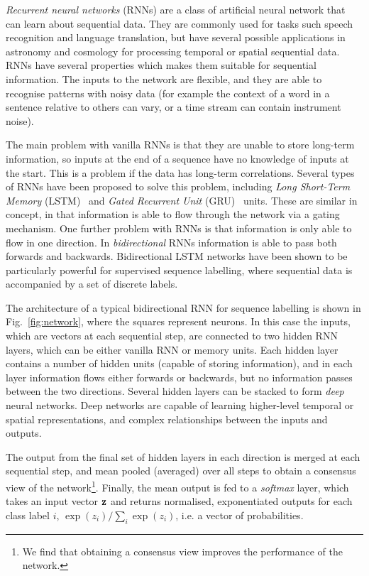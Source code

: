 \documentclass[nofootinbib,amsmath,amssymb,10pt,eqsecnum, twocolumn]{revtex4-1}
\begin{document}
{\em Recurrent neural networks} (RNNs) are a class of artificial neural network  that can learn about sequential data. They are commonly used for tasks such speech recognition and language translation, but have several possible applications in astronomy  and cosmology for processing temporal or spatial sequential data. RNNs have several properties which makes them suitable for sequential information. The inputs to the network are flexible, and they are able to recognise patterns with noisy data (for example the context of a word in a sentence relative to others can vary, or a time stream can contain instrument noise). 

The main problem with vanilla RNNs  is that they are unable to store long-term information, so inputs at the end of a sequence have no knowledge of inputs at the start. This is a problem if the data has long-term correlations. Several types of RNNs have been proposed to solve this problem, including {\em Long Short-Term Memory} (LSTM)~\cite{LSTM} and {\em Gated Recurrent Unit} (GRU)~\cite{2014arXiv1412.3555C} units. These are similar in concept, in that information is able to flow through the network via a gating mechanism. One further problem with RNNs is that information is only able to flow in one direction. In {\em bidirectional} RNNs information is able to pass both forwards and backwards. Bidirectional LSTM networks have been shown to be particularly powerful for supervised sequence labelling, where sequential data is accompanied by a set of discrete labels. 

The architecture of a typical bidirectional RNN for sequence labelling is shown in Fig.~\ref{fig:network}, where the squares represent {\rm neurons}. In this case the inputs, which are vectors at each sequential step, are connected to two hidden RNN layers, which can be either vanilla RNN or memory units.  Each hidden layer contains a number of hidden units (capable of storing information), and in each layer information flows either forwards or backwards,  but no information passes between the two directions. Several hidden layers can be stacked to form {\em deep} neural networks. Deep networks are capable of learning higher-level temporal or spatial representations, and complex relationships between the inputs and outputs.

The output from the final set of hidden layers in each direction is merged at each sequential step, and mean pooled (averaged) over all steps to obtain a consensus view of the network\footnote{We find that obtaining a consensus view improves the performance of the network.}. Finally, the mean output is fed to a {\em softmax} layer, which takes an input vector ${\bf z}$ and returns normalised, exponentiated outputs for each class label $i$, $\exp(z_i) / \sum_{i} \exp(z_i)$, i.e. a vector of probabilities.
\end{document}
